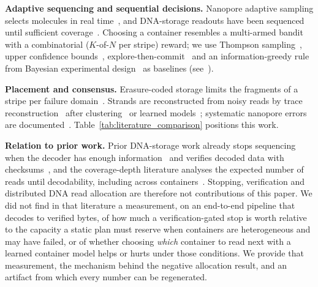 \documentclass[conference,onecolumn,11pt]{IEEEtran}
\begin{document}
\textbf{Adaptive sequencing and sequential decisions.}  Nanopore adaptive sampling selects
molecules in real time~\cite{loose2016real,payne2021readfish,weilguny2023dynamic}, and
DNA-storage readouts have been sequenced until sufficient coverage~\cite{lopez2019dna}.
Choosing a container resembles a multi-armed bandit with a combinatorial ($K$-of-$N$ per stripe)
reward; we use Thompson sampling~\cite{thompson1933likelihood,russo2018tutorial}, upper
confidence bounds~\cite{auer2002finite}, explore-then-commit~\cite{garivier2016explore} and an
information-greedy rule from Bayesian experimental design~\cite{chaloner1995bayesian} as
baselines (see~\cite{lattimore2020bandit}).

\textbf{Placement and consensus.}  Erasure-coded storage limits the fragments of a stripe per
failure domain~\cite{weil2006crush,cidon2013copysets,ford2010availability,nath2006subtleties,leong2012distributed}.
Strands are reconstructed from noisy reads by trace
reconstruction~\cite{batu2004reconstructing,srinivasavaradhan2021trellis,sabary2024reconstruction}
after clustering~\cite{rashtchian2017clustering} or learned models~\cite{barlev2025deep};
systematic nanopore errors are documented~\cite{delahaye2021sequencing,wick2019performance}.
Table~\ref{tab:literature_comparison} positions this work.

\textbf{Relation to prior work.}  Prior DNA-storage work already stops sequencing when the decoder has
enough information~\cite{lopez2019dna} and verifies decoded data with
checksums~\cite{erlich2017fountain}, and the coverage-depth literature analyses the expected number of
reads until decodability, including across
containers~\cite{barlev2025cover,kong2026coverage,levy2026expected}.  Stopping, verification and
distributed DNA read allocation are therefore not contributions of this paper.  We did not find in that
literature a measurement, on an end-to-end pipeline that decodes to verified bytes, of how much a
verification-gated stop is worth relative to the capacity a static plan must reserve when containers
are heterogeneous and may have failed, or of whether choosing \emph{which} container to read next with a
learned container model helps or hurts under those conditions.  We provide that measurement, the
mechanism behind the negative allocation result, and an artifact from which every number can be
regenerated.


\end{document}
